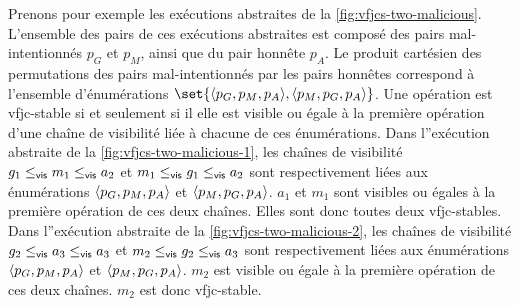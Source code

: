 Prenons pour exemple les exécutions abstraites de la \autoref{fig:vfjcs-two-malicious}.
L'ensemble des pairs de ces exécutions abstraites est composé des pairs mal-intentionnés $p_G$ et $p_M$, ainsi que du pair honnête $p_A$.
Le produit cartésien des permutations des pairs mal-intentionnés par les pairs honnêtes correspond à l'ensemble d'énumérations $\set{\tuple*{p_G, p_M, p_A}, \tuple*{p_M, p_G, p_A}}$.
Une opération est vfjc-stable si et seulement si il elle est visible ou égale à la première opération d'une chaîne de visibilité liée à chacune de ces énumérations.
Dans l''exécution abstraite de la \autoref{fig:vfjcs-two-malicious-1}, les chaînes de visibilité $g_1 \viseq m_1 \viseq a_2$ et $m_1 \viseq g_1 \viseq a_2$ sont respectivement liées aux énumérations $\tuple*{p_G, p_M, p_A}$ et $\tuple*{p_M, p_G, p_A}$.
$a_1$ et $m_1$ sont visibles ou égales à la première opération de ces deux chaînes.
Elles sont donc toutes deux vfjc-stables.
Dans l''exécution abstraite de la \autoref{fig:vfjcs-two-malicious-2}, les chaînes de visibilité $g_2 \viseq a_3 \viseq a_3$ et $m_2 \viseq g_2 \viseq a_3$ sont respectivement liées aux énumérations $\tuple*{p_G, p_M, p_A}$ et $\tuple*{p_M, p_G, p_A}$.
$m_2$ est visible ou égale à la première opération de ces deux chaînes.
$m_2$ est donc vfjc-stable.

